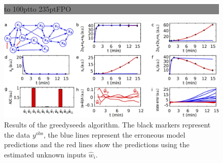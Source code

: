 \begin{figure}[!tpb]%
\fboxsep=0pt\colorbox{gray}{\begin{minipage}[t]{235pt} \vbox to 100pt{\vfill\hbox to
235pt{\hfill\fontsize{24pt}{24pt}\selectfont FPO\hfill}\vfill}
\end{minipage}}
\centerline{\includegraphics{figures/uvb.png}}
\caption{Results of the \textsf{greedyseeds} algorithm. The black markers represent 
the data $y^\text{obs}$, the blue lines represent the erroneous model predictions and 
the red lines show the predictions using the estimated unknown inputs $\hat{w}_i$.}
\label{fig:example}
\end{figure}

